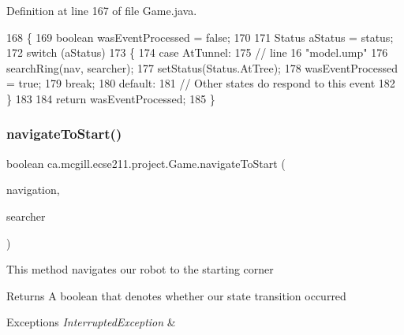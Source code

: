 Definition at line 167 of file Game.\+java.


\begin{DoxyCode}
168   \{
169     \textcolor{keywordtype}{boolean} wasEventProcessed = \textcolor{keyword}{false};
170     
171     Status aStatus = status;
172     \textcolor{keywordflow}{switch} (aStatus)
173     \{
174       \textcolor{keywordflow}{case} AtTunnel:
175         \textcolor{comment}{// line 16 "model.ump"}
176         searchRing(nav, searcher);
177         setStatus(Status.AtTree);
178         wasEventProcessed = \textcolor{keyword}{true};
179         \textcolor{keywordflow}{break};
180       \textcolor{keywordflow}{default}:
181         \textcolor{comment}{// Other states do respond to this event}
182     \}
183 
184     \textcolor{keywordflow}{return} wasEventProcessed;
185   \}
\end{DoxyCode}
\mbox{\label{enumca_1_1mcgill_1_1ecse211_1_1project_1_1_game_aa9d873f6cd4ef177c1622c24f72b0e0a}} 
\subsubsection{\texorpdfstring{navigate\+To\+Start()}{navigateToStart()}}
{\footnotesize\ttfamily boolean ca.\+mcgill.\+ecse211.\+project.\+Game.\+navigate\+To\+Start (\begin{DoxyParamCaption}\item[{\hyperlink{classca_1_1mcgill_1_1ecse211_1_1project_1_1_navigation}{Navigation}}]{navigation,  }\item[{\hyperlink{classca_1_1mcgill_1_1ecse211_1_1threads_1_1_ring_searcher}{Ring\+Searcher}}]{searcher }\end{DoxyParamCaption})}

This method navigates our robot to the starting corner

\begin{DoxyReturn}{Returns}
A boolean that denotes whether our state transition occurred 
\end{DoxyReturn}

\begin{DoxyExceptions}{Exceptions}
{\em Interrupted\+Exception} & \\
\hline
\end{DoxyExceptions}


